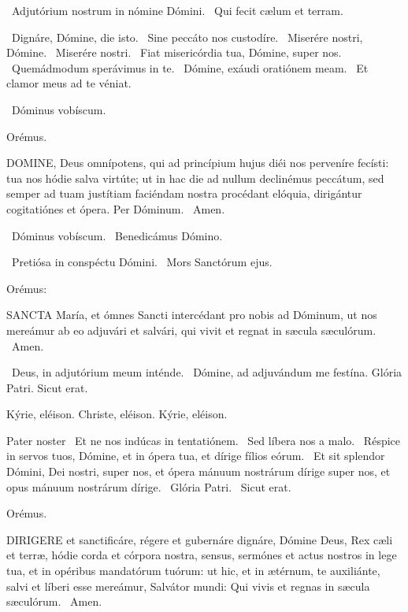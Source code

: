 
\V\ Adjutórium nostrum in nómine Dómini. \R\ Qui fecit cælum et terram.


\V\ Dignáre, Dómine, die isto. \R\ Sine peccáto nos custodíre. \V\ Miserére nostri, Dómine. \R\ Miserére nostri. \V\ Fiat misericórdia tua, Dómine, super nos. \R\ Quemádmodum sperávimus in te. \V\ Dómine, exáudi oratiónem meam. \R\ Et clamor meus ad te véniat.

\V\ Dóminus vobíscum.

Orémus. 

\lettrine[lines=2]{D}{OMINE}, Deus omnípotens, qui ad princípium hujus diéi nos perveníre fecísti: tua nos hódie salva virtúte; ut in hac die ad nullum declinémus peccátum, sed semper ad tuam justítiam faciéndam nostra procédant elóquia, dirigántur cogitatiónes et ópera. Per Dóminum. \R\ Amen.

\V\ Dóminus vobíscum. \V\ Benedicámus Dómino.


\V\ Pretiósa in conspéctu Dómini. \R\ Mors Sanctórum ejus.

 Orémus:


\lettrine[lines=2]{S}{ANCTA} María, et ómnes Sancti intercédant pro nobis ad Dóminum, ut nos mereámur ab eo adjuvári et salvári, qui vivit et regnat in sæcula sæculórum. \R\ Amen.

\V\ Deus, in adjutórium meum inténde. \R\ Dómine, ad adjuvándum me festína.  Glória Patri. Sicut erat.

Kýrie, eléison. Christe, eléison. Kýrie, eléison.

Pater noster  \V\ Et ne nos indúcas in tentatiónem. \R\ Sed líbera nos a malo. \V\ Réspice in servos tuos, Dómine, et in ópera tua, et dírige fílios eórum. \R\ Et sit splendor Dómini, Dei nostri, super nos, et ópera mánuum nostrárum dírige super nos, et opus mánuum nostrárum dírige. \V\ Glória Patri. \R\ Sicut erat.

Orémus. 

\lettrine[lines=2]{D}{IRIGERE} et sanctificáre, régere et gubernáre dignáre, Dómine Deus, Rex cæli et terræ, hódie corda et córpora nostra, sensus, sermónes et actus nostros in lege tua, et in opéribus mandatórum tuórum: ut hic, et in ætérnum, te auxiliánte, salvi et líberi esse mereámur, Salvátor mundi: Qui vivis et regnas in sæcula sæculórum. \R\ Amen.

